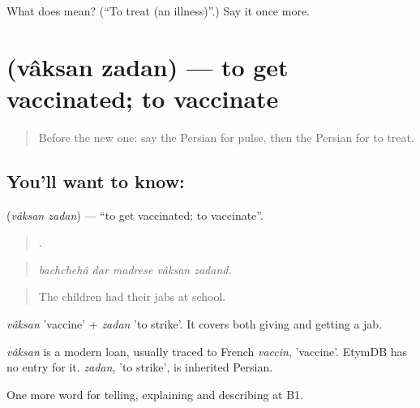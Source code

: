 \begin{tcolorbox}[breakable,colback=teal!4,colframe=teal!35!black,title={Before you move on}]
What does   mean? (\textquotedblleft{}To treat (an illness)\textquotedblright{}.) Say it once more.
\end{tcolorbox}
\section[\texorpdfstring{\fa{واکسن} \fa{زدن} (vâksan zadan)}{واکسن زدن (vâksan zadan)}]{  (vâksan zadan) — to get vaccinated; to vaccinate}

\label{lesson:FA-C493-vaksan-zadan}



\begin{quote}
Before the new one: say the Persian for pulse, then the Persian for to treat.
\end{quote}

\subsection*{You'll want to know:  }
\textbf{ } (\emph{vâksan zadan}) — \textquotedblleft{}to get vaccinated; to vaccinate\textquotedblright{}.

\begin{quote}
     .
\end{quote}

\begin{quote}
\emph{bachchehâ dar madrese vâksan zadand.}
\end{quote}

\begin{quote}
The children had their jabs at school.
\end{quote}

\emph{vâksan} 'vaccine' + \emph{zadan} 'to strike'. It covers both giving and getting a jab.

\begin{cousinweb}
\emph{vâksan} is a modern loan, usually traced to French \emph{vaccin}, 'vaccine'. EtymDB has no entry for it. \emph{zadan}, 'to strike', is inherited Persian.
\end{cousinweb}

\begin{grammarlens}[title={What you've built}]
One more word for telling, explaining and describing at B1.
\end{grammarlens}

